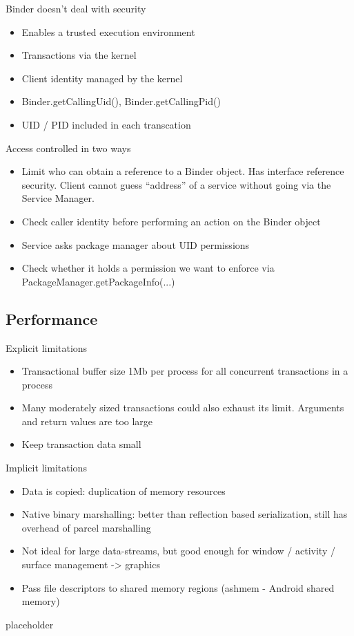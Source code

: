 \documentclass{article}
\begin{document}
\begin{flushleft}
Binder	doesn’t	deal	with	security
\begin{itemize}
  \item Enables a trusted execution environment
  \item Transactions via the kernel 
  \item Client identity managed by the kernel 
  \item Binder.getCallingUid(), Binder.getCallingPid() 
  \item UID / PID included in each transcation
\end{itemize}
Access controlled in two ways
\begin{itemize}
  \item Limit who can obtain a reference to a Binder object. Has interface reference security. Client cannot guess “address” of a service without going via the Service Manager.
  \item Check caller identity before performing an action on the Binder object 
  \item Service asks package manager about UID permissions 
  \item Check whether it holds a permission we want to enforce via PackageManager.getPackageInfo(...) 
\end{itemize}
\end{flushleft}
\newpage

\subsection{Performance}

\begin{flushleft}
Explicit limitations
\begin{itemize}
  \item Transactional buffer size 1Mb per process for all concurrent transactions in a process 
  \item Many moderately sized transactions could also exhaust its limit. Arguments and return values are too large 
  \item Keep transaction data small
\end{itemize}
Implicit limitations
\begin{itemize}
  \item Data is copied: duplication of memory resources
  \item Native binary marshalling: better than reflection based serialization, still has overhead of parcel marshalling 
  \item Not ideal for large data-streams, but good enough for window / activity / surface management -> graphics 
  \item Pass file descriptors to shared memory regions (ashmem - Android shared memory)
\end{itemize}
\end{flushleft}

\begin{description}
	\item[placeholder] \hfill \\
\end{description}
\end{document}
